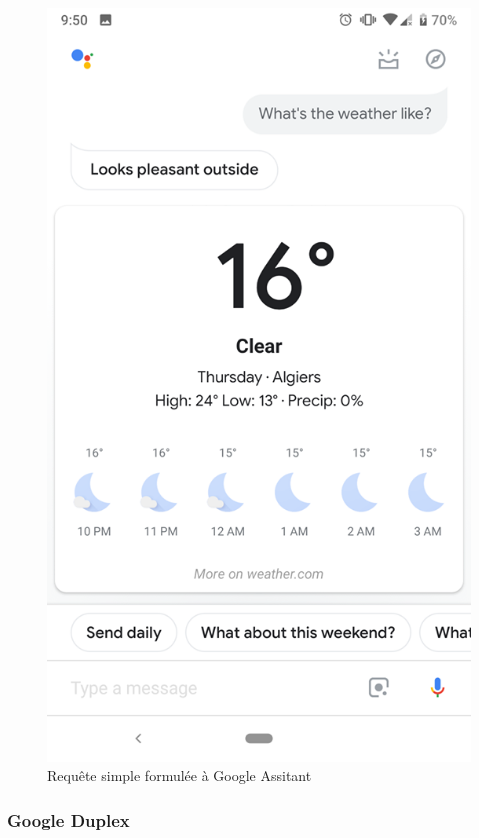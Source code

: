 \begin{figure}[H]
\begin{minipage}[b]{.45\textwidth}
	\end{minipage}
	\hspace{0.5cm}
	\begin{minipage}[b]{.45\textwidth}
		\centering
		\includegraphics[width=.85\linewidth]{images/google_assitant/weather.png} 
		\caption{Requête simple formulée à Google Assitant} 
	\end{minipage}
\end{figure}


\subsubsection*{Google Duplex}\label{duplex}

